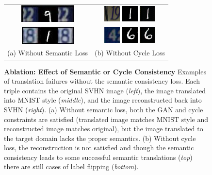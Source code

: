 
\begin{figure}
	\centering
	\begin{tabular}{cc}
	\includegraphics[height=.1\linewidth]{figs/svhn2mnist_cyclegan_bad_cycle3.jpeg} &
	\includegraphics[height=.1\linewidth]{figs/digit-ablation/no-cycle/1_00000_real_B.png}
	\includegraphics[height=.1\linewidth]{figs/digit-ablation/no-cycle/1_00000_fake_A.png}
	\includegraphics[height=.1\linewidth]{figs/digit-ablation/no-cycle/1_00000_rec_B.png}
	\\
	\includegraphics[height=.1\linewidth]{figs/svhn2mnist_cyclegan_bad_cycle4.jpeg} &
	\includegraphics[height=.1\linewidth]{figs/digit-ablation/no-cycle/4_00026_real_B.png}
	\includegraphics[height=.1\linewidth]{figs/digit-ablation/no-cycle/4_00026_fake_A.png}
	\includegraphics[height=.1\linewidth]{figs/digit-ablation/no-cycle/4_00026_rec_B.png}\\
	(a) Without Semantic Loss & (b) Without Cycle Loss
	\end{tabular}
	\caption{\textbf{Ablation: Effect of Semantic or Cycle Consistency} Examples of translation failures without the semantic consistency loss. Each triple contains the original SVHN image (\textit{left}), the image translated into MNIST style (\textit{middle}), and the image reconstructed back into SVHN (\textit{right}). (a) Without semantic loss, both the GAN and cycle constraints are satisfied (translated image matches MNIST style and reconstructed image matches original), but the image translated to the target domain lacks the proper semantics. (b) Without cycle loss, the reconstruction is not satisfied and though the semantic consistency leads to some successful semantic translations (\textit{top}) there are still cases of label flipping (\textit{bottom}).}

\end{figure}
